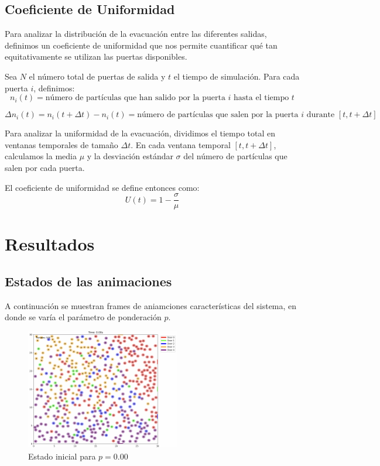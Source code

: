 \documentclass[12pt]{article}
\begin{document}
\subsection{Coeficiente de Uniformidad}

Para analizar la distribución de la evacuación entre las diferentes salidas, definimos un coeficiente de uniformidad que nos permite cuantificar qué tan equitativamente se utilizan las puertas disponibles. 

Sea $N$ el número total de puertas de salida y $t$ el tiempo de simulación. Para cada puerta $i$, definimos:
\[
n_i(t) = \text{número de partículas que han salido por la puerta } i \text{ hasta el tiempo } t
\]

\[
\Delta n_i(t) = n_i(t + \Delta t) - n_i(t) = \text{número de partículas que salen por la puerta } i \text{ durante } [t, t+\Delta t]
\]

Para analizar la uniformidad de la evacuación, dividimos el tiempo total en ventanas temporales de tamaño $\Delta t$. En cada ventana temporal $[t, t+\Delta t]$, calculamos la media $\mu$ y la desviación estándar $\sigma$ del número de partículas que salen por cada puerta.

El coeficiente de uniformidad se define entonces como:
\[
U(t) = 1 - \frac{\sigma}{\mu}
\]


\section{Resultados}

\subsection{Estados de las animaciones}

A continuación se muestran frames de aniamciones características del sistema, en donde se varía el parámetro de ponderación $p$.
\begin{figure}[H]
\centering
\includegraphics[width=0.6\textwidth]{img/frames/t_20_&_p_0.00.jpg}
\caption{Estado inicial para $p=0.00$}
\label{fig:evac_time_ct}
\end{figure}
\end{document}

